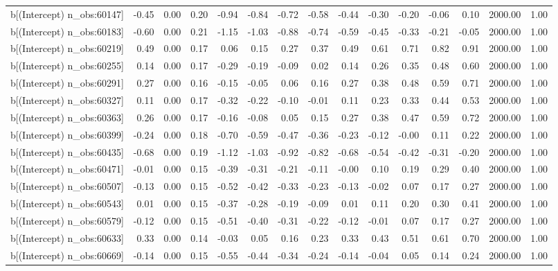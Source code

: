 \begin{table}[ht]
\begin{tabular}{rrrrrrrrrrrrrrr}
  b[(Intercept) n\_obs:60147] & -0.45 & 0.00 & 0.20 & -0.94 & -0.84 & -0.72 & -0.58 & -0.44 & -0.30 & -0.20 & -0.06 & 0.10 & 2000.00 & 1.00 \\ 
  b[(Intercept) n\_obs:60183] & -0.60 & 0.00 & 0.21 & -1.15 & -1.03 & -0.88 & -0.74 & -0.59 & -0.45 & -0.33 & -0.21 & -0.05 & 2000.00 & 1.00 \\ 
  b[(Intercept) n\_obs:60219] & 0.49 & 0.00 & 0.17 & 0.06 & 0.15 & 0.27 & 0.37 & 0.49 & 0.61 & 0.71 & 0.82 & 0.91 & 2000.00 & 1.00 \\ 
  b[(Intercept) n\_obs:60255] & 0.14 & 0.00 & 0.17 & -0.29 & -0.19 & -0.09 & 0.02 & 0.14 & 0.26 & 0.35 & 0.48 & 0.60 & 2000.00 & 1.00 \\ 
  b[(Intercept) n\_obs:60291] & 0.27 & 0.00 & 0.16 & -0.15 & -0.05 & 0.06 & 0.16 & 0.27 & 0.38 & 0.48 & 0.59 & 0.71 & 2000.00 & 1.00 \\ 
  b[(Intercept) n\_obs:60327] & 0.11 & 0.00 & 0.17 & -0.32 & -0.22 & -0.10 & -0.01 & 0.11 & 0.23 & 0.33 & 0.44 & 0.53 & 2000.00 & 1.00 \\ 
  b[(Intercept) n\_obs:60363] & 0.26 & 0.00 & 0.17 & -0.16 & -0.08 & 0.05 & 0.15 & 0.27 & 0.38 & 0.47 & 0.59 & 0.72 & 2000.00 & 1.00 \\ 
  b[(Intercept) n\_obs:60399] & -0.24 & 0.00 & 0.18 & -0.70 & -0.59 & -0.47 & -0.36 & -0.23 & -0.12 & -0.00 & 0.11 & 0.22 & 2000.00 & 1.00 \\ 
  b[(Intercept) n\_obs:60435] & -0.68 & 0.00 & 0.19 & -1.12 & -1.03 & -0.92 & -0.82 & -0.68 & -0.54 & -0.42 & -0.31 & -0.20 & 2000.00 & 1.00 \\ 
  b[(Intercept) n\_obs:60471] & -0.01 & 0.00 & 0.15 & -0.39 & -0.31 & -0.21 & -0.11 & -0.00 & 0.10 & 0.19 & 0.29 & 0.40 & 2000.00 & 1.00 \\ 
  b[(Intercept) n\_obs:60507] & -0.13 & 0.00 & 0.15 & -0.52 & -0.42 & -0.33 & -0.23 & -0.13 & -0.02 & 0.07 & 0.17 & 0.27 & 2000.00 & 1.00 \\ 
  b[(Intercept) n\_obs:60543] & 0.01 & 0.00 & 0.15 & -0.37 & -0.28 & -0.19 & -0.09 & 0.01 & 0.11 & 0.20 & 0.30 & 0.41 & 2000.00 & 1.00 \\ 
  b[(Intercept) n\_obs:60579] & -0.12 & 0.00 & 0.15 & -0.51 & -0.40 & -0.31 & -0.22 & -0.12 & -0.01 & 0.07 & 0.17 & 0.27 & 2000.00 & 1.00 \\ 
  b[(Intercept) n\_obs:60633] & 0.33 & 0.00 & 0.14 & -0.03 & 0.05 & 0.16 & 0.23 & 0.33 & 0.43 & 0.51 & 0.61 & 0.70 & 2000.00 & 1.00 \\ 
  b[(Intercept) n\_obs:60669] & -0.14 & 0.00 & 0.15 & -0.55 & -0.44 & -0.34 & -0.24 & -0.14 & -0.04 & 0.05 & 0.14 & 0.24 & 2000.00 & 1.00 \\ 

\end{tabular}
\end{table}
